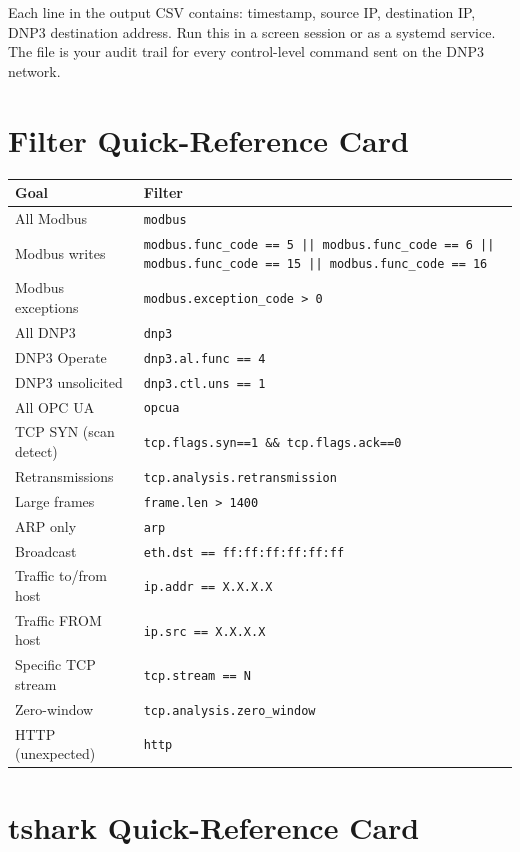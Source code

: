 \documentclass[12pt,twoside,openright]{memoir}
\newcommand{\filter}[1]{\texttt{\color{wsblue}#1}}
\begin{document}
Each line in the output CSV contains: timestamp, source IP, destination IP, DNP3 destination address. Run this in a screen session or as a systemd service. The file is your audit trail for every control-level command sent on the DNP3 network.

\section{Filter Quick-Reference Card}

\begin{filterbox}
\begin{center}
\begin{tabular}{L{5.5cm}L{5.5cm}}
\toprule
\textbf{Goal} & \textbf{Filter} \\
\midrule
All Modbus & \filter{modbus} \\
Modbus writes & \filter{modbus.func\_code == 5 || modbus.func\_code == 6 || modbus.func\_code == 15 || modbus.func\_code == 16} \\
Modbus exceptions & \filter{modbus.exception\_code > 0} \\
All DNP3 & \filter{dnp3} \\
DNP3 Operate & \filter{dnp3.al.func == 4} \\
DNP3 unsolicited & \filter{dnp3.ctl.uns == 1} \\
All OPC UA & \filter{opcua} \\
TCP SYN (scan detect) & \filter{tcp.flags.syn==1 \&\& tcp.flags.ack==0} \\
Retransmissions & \filter{tcp.analysis.retransmission} \\
Large frames & \filter{frame.len > 1400} \\
ARP only & \filter{arp} \\
Broadcast & \filter{eth.dst == ff:ff:ff:ff:ff:ff} \\
Traffic to/from host & \filter{ip.addr == X.X.X.X} \\
Traffic FROM host & \filter{ip.src == X.X.X.X} \\
Specific TCP stream & \filter{tcp.stream == N} \\
Zero-window & \filter{tcp.analysis.zero\_window} \\
HTTP (unexpected) & \filter{http} \\
\bottomrule
\end{tabular}
\end{center}
\end{filterbox}

\section{tshark Quick-Reference Card}
\end{document}
